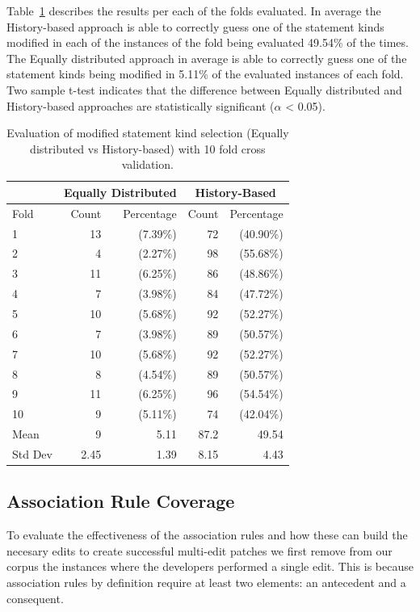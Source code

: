 \documentclass[sigconf]{acmart}
\begin{document}
Table~\ref{10FoldEDvsHB} describes the results per each of the folds evaluated.
In average 
the History-based approach is able to correctly guess one of  the statement kinds modified
in each of the instances of the fold being evaluated 49.54\% of the times. The Equally distributed approach
in average is able to correctly guess one of the statement kinds being modified in 5.11\% 
of the evaluated instances of each fold.
Two sample t-test indicates that the difference between Equally distributed and History-based approaches are statistically significant ($\alpha$ < 0.05).


\begin{table}[]
\centering
\caption{Evaluation of modified statement kind selection (Equally distributed vs History-based) with 10 fold cross validation.}
\label{10FoldEDvsHB}
\begin{tabular}{l|rr|rr}
\toprule
   &   \multicolumn{2}{c|}{ Equally Distributed}   &   \multicolumn{2}{|c}{ History-Based} \\
\midrule
Fold  &   Count & Percentage  &  Count & Percentage  \\
\midrule
1&13&(7.39\%) & 72&(40.90\%) \\
2&4&(2.27\%) & 98&(55.68\%) \\
3&11&(6.25\%) & 86&(48.86\%) \\
4&7&(3.98\%) & 84&(47.72\%) \\
5&10&(5.68\%) & 92&(52.27\%) \\
6&7&(3.98\%) & 89&(50.57\%) \\
7&10&(5.68\%) & 92&(52.27\%) \\
8&8&(4.54\%) & 89&(50.57\%) \\
9&11&(6.25\%) & 96&(54.54\%) \\
10&9&(5.11\%) & 74&(42.04\%) \\
\bottomrule
Mean &9 & 5.11 & 87.2 & 49.54 \\
\bottomrule
Std Dev & 2.45 & 1.39 & 8.15 & 4.43 \\
\bottomrule

\end{tabular}
\end{table}



\subsection{Association Rule Coverage}
To evaluate the effectiveness
of the association rules and how these can build the
necesary edits to create successful multi-edit patches we first
remove from our corpus the instances where the developers
performed a single edit. This is because association rules
by definition require at least two elements: an antecedent
and a consequent. 
\end{document}
